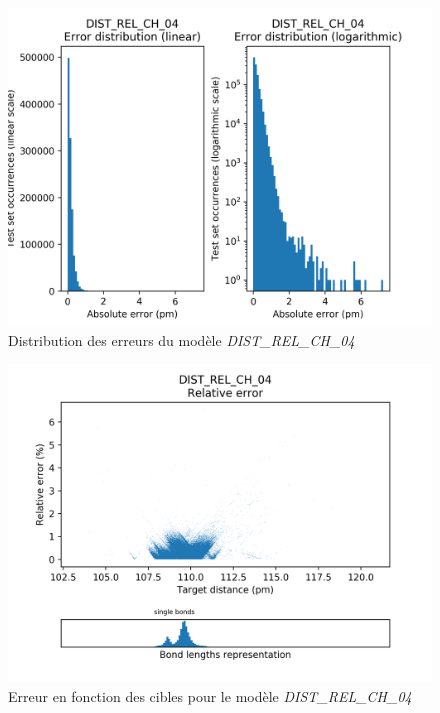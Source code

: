 
\begin{figure}[!h]
	\centering
	
	\includegraphics[scale=0.8]{../figures/DIST_REL_CH_04/DIST_REL_CH_04_distrib_rmse_val.png}	
	
	\caption{Distribution des erreurs du modèle \emph{DIST\_REL\_CH\_04}}
\end{figure}

\begin{figure}[!h]
	\centering
	
	\includegraphics[scale=0.8]{../figures/DIST_REL_CH_04/DIST_REL_CH_04_distrib_rmse_dist.png}	
	
	\caption{Erreur en fonction des cibles pour le modèle \emph{DIST\_REL\_CH\_04}}
\end{figure}


